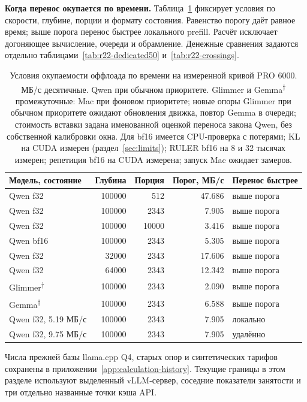 \textbf{Когда перенос окупается по времени.} Таблица~\ref{tab:when-pays} фиксирует условия по скорости,
глубине, порции и формату состояния. Равенство порогу даёт равное время; выше порога перенос быстрее локального prefill.
Расчёт исключает догоняющее вычисление, очереди и обрамление. Денежные сравнения задаются отдельно таблицами~\ref{tab:r22-dedicated50} и~\ref{tab:r22-crossings}.

\begin{table}[t]
\centering
\caption{Условия окупаемости оффлоада по времени на измеренной кривой PRO 6000. МБ/с десятичные.
Qwen при обычном приоритете. Glimmer и Gemma\textsuperscript{†} промежуточные: Mac при фоновом приоритете; новые опоры Glimmer при обычном приоритете ожидают обновления движка, повтор Gemma в очереди;
стоимость вставки задана именованной оценкой переноса закона Qwen, без собственной калибровки окна.
Для bf16 имеется CPU-проверка с потерями; KL на CUDA измерен (раздел~\ref{sec:limits}); RULER bf16 на 8 и 32 тысячах измерен; репетиция bf16 на CUDA измерена; запуск Mac ожидает замеров.}
\label{tab:when-pays}
\footnotesize
\begin{tabular}{lrrrl}
\toprule
Модель, состояние & Глубина & Порция & Порог, МБ/с & Перенос быстрее \\
\midrule
Qwen f32 & 100000 & 512 & 47.686 & выше порога \\
Qwen f32 & 100000 & 2343 & 7.905 & выше порога \\
Qwen f32 & 100000 & 10000 & 3.416 & выше порога \\
Qwen bf16 & 100000 & 2343 & 5.305 & выше порога \\
Qwen f32 & 32000 & 2343 & 17.606 & выше порога \\
Qwen f32 & 64000 & 2343 & 12.342 & выше порога \\
Glimmer\textsuperscript{†} & 100000 & 2343 & 2.090 & выше порога \\
Gemma\textsuperscript{†} & 100000 & 2343 & 6.588 & выше порога \\
Qwen f32, 5.19 МБ/с & 100000 & 2343 & 7.905 & локально \\
Qwen f32, 9.75 МБ/с & 100000 & 2343 & 7.905 & удалённо \\
\bottomrule
\end{tabular}
\end{table}

Числа прежней базы llama.cpp Q4, старых опор и синтетических тарифов сохранены
в приложении~\ref{app:calculation-history}. Текущие границы в этом разделе используют выделенный vLLM-сервер,
соседние показатели занятости и три отдельно названные точки кэша API.

